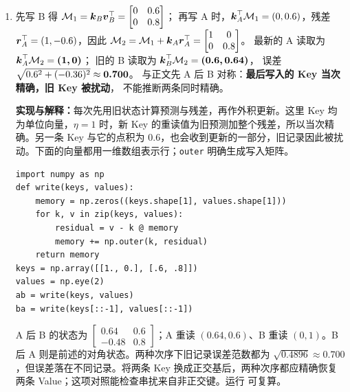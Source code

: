 \begin{enumerate}[label={},leftmargin=4.8em,itemsep=4pt]
\item[\textbf{\hyperref[exercise:delta-write-order]{C-135.}}] \leavevmode{}\label{solution:C-135}\label{solution:delta-write-order}先写 B 得
$\mathcal{M}_1=\boldsymbol{k}_B \boldsymbol{v}_B^\top=\begin{bmatrix}0&0.6\\0&0.8\end{bmatrix}$；
再写 A 时，$\boldsymbol{k}_A^\top\mathcal{M}_1=(0,0.6)$，残差
$\boldsymbol{r}_A^\top=(1,-0.6)$，因此
$\mathcal{M}_2=\mathcal{M}_1+\boldsymbol{k}_A \boldsymbol{r}_A^\top=
\begin{bmatrix}1&0\\0&0.8\end{bmatrix}$。
最新的 A 读取为 $\boldsymbol{k}_A^\top\mathcal{M}_2=\boldsymbol{(1,0)}$；
旧的 B 读取为 $\boldsymbol{k}_B^\top\mathcal{M}_2=\boldsymbol{(0.6,0.64)}$，
误差 $\sqrt{0.6^2+(-0.36)^2}\approx\boldsymbol{0.700}$。
与正文先 A 后 B 对称：\textbf{最后写入的 Key 当次精确，旧 Key 被扰动}，
不能推断两条同时精确。
\par\textbf{实现与解释：}每次先用旧状态计算预测与残差，再作外积更新。这里 Key 均为单位向量，$\eta=1$ 时，新 Key 的重读值为旧预测加整个残差，所以当次精确。另一条 Key 与它的点积为 $0.6$，也会收到更新的一部分，旧记录因此被扰动。下面的向量都用一维数组表示行；\texttt{outer} 明确生成写入矩阵。\par\nobreak
\begin{samepage}\begin{verbatim}
import numpy as np
def write(keys, values):
    memory = np.zeros((keys.shape[1], values.shape[1]))
    for k, v in zip(keys, values):
        residual = v - k @ memory
        memory += np.outer(k, residual)
    return memory
keys = np.array([[1., 0.], [.6, .8]])
values = np.eye(2)
ab = write(keys, values)
ba = write(keys[::-1], values[::-1])
\end{verbatim}\end{samepage}
A 后 B 的状态为 $\left[\begin{smallmatrix}0.64&0.6\\-0.48&0.8\end{smallmatrix}\right]$；A 重读 $(0.64,0.6)$、B 重读 $(0,1)$。B 后 A 则是前述的对角状态。两种次序下旧记录误差范数都为 $\sqrt{0.4896}\approx0.700$，但误差落在不同记录。将两条 Key 换成正交基后，两种次序都应精确恢复两条 Value；这项对照能检查串扰来自非正交键。运行  可复算。
\end{enumerate}
